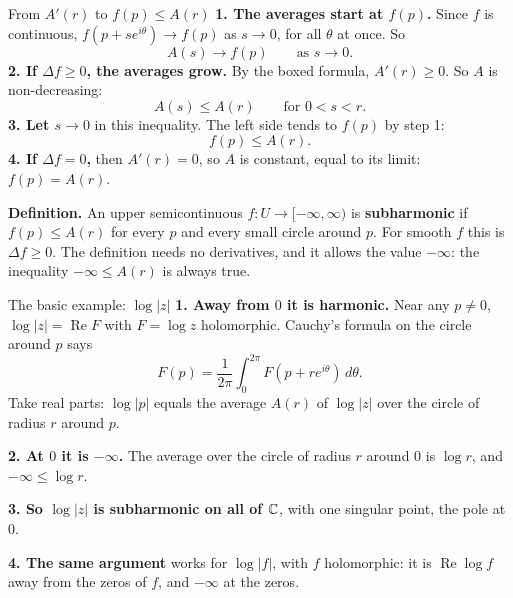 \begin{frame}{From \(A'(r)\) to \(f(p)\le A(r)\)}
\textbf{1. The averages start at \(f(p)\).} Since \(f\) is continuous, \(f(p+se^{i\theta})\to f(p)\) as \(s\to0\), for all \(\theta\) at once. So
\[
A(s)\to f(p)\qquad\text{as } s\to0 .
\]
\textbf{2. If \(\Delta f\ge0\), the averages grow.} By the boxed formula, \(A'(r)\ge0\). So \(A\) is non-decreasing:
\[
A(s)\le A(r)\qquad\text{for } 0<s<r .
\]
\textbf{3. Let \(s\to0\)} in this inequality. The left side tends to \(f(p)\) by step 1:
\[
\boxed{f(p)\le A(r).}
\]
\textbf{4. If \(\Delta f=0\),} then \(A'(r)=0\), so \(A\) is constant, equal to its limit: \(f(p)=A(r)\).
\par\medskip
\textbf{Definition.} An upper semicontinuous \(f:U\to[-\infty,\infty)\) is \textbf{subharmonic} if
\(f(p)\le A(r)\) for every \(p\) and every small circle around \(p\).
For smooth \(f\) this is \(\Delta f\ge0\). The definition needs no derivatives, and it allows the value \(-\infty\): the inequality \(-\infty\le A(r)\) is always true.
\end{frame}

\begin{frame}{The basic example: \(\log|z|\)}
\label{fr:the-basic-example-z-36}
\textbf{1. Away from \(0\) it is harmonic.} Near any \(p\ne0\), \(\log|z|=\operatorname{Re}F\) with \(F=\log z\) holomorphic. Cauchy's formula on the circle around \(p\) says
\[
F(p)=\frac{1}{2\pi}\int_0^{2\pi}F(p+re^{i\theta})\,d\theta .
\]
Take real parts: \(\log|p|\) equals the average \(A(r)\) of \(\log|z|\) over the circle of radius \(r\) around \(p\).
\par\medskip
\textbf{2. At \(0\) it is \(-\infty\).} The average over the circle of radius \(r\) around \(0\) is \(\log r\), and \(-\infty\le\log r\).
\par\medskip
\textbf{3. So \(\log|z|\) is subharmonic on all of \(\mathbb C\)}, with one singular point, the pole at \(0\).
\par
\textbf{4. The same argument} works for \(\log|f|\), with \(f\) holomorphic: it is \(\operatorname{Re}\log f\) away from the zeros of \(f\), and \(-\infty\) at the zeros.
\end{frame}

